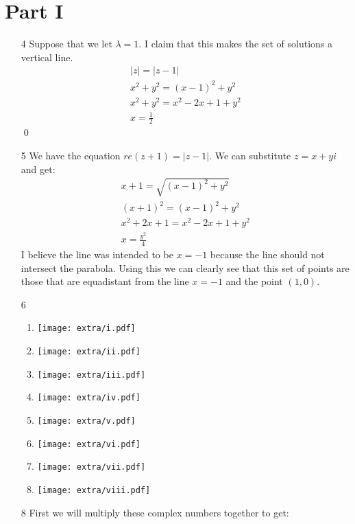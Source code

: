 \documentclass{article}
\begin{document}
  \section{Part I}
  \begin{enumerate}
    \item[4]
      Suppose that we let $\lambda=1$. I claim that this makes the set of solutions a vertical line.
      \begin{align}
        |z|=|z-1|\\
        x^2+y^2=(x-1)^2+y^2\\
        x^2+y^2=x^2-2x+1+y^2\\
        x=\frac{1}{2}
      \end{align}\qed
    \item[5]
      We have the equation $re(z+1)=|z-1|$. We can substitute $z=x+yi$ and get:
      \begin{align}
        x+1=\sqrt{(x-1)^2+y^2}\\
        (x+1)^2=(x-1)^2+y^2\\
        x^2+2x+1=x^2-2x+1+y^2\\
        x=\frac{y^2}{4}
      \end{align}
      I believe the line was intended to be $x=-1$ because the line should not intersect the parabola. Using this we can clearly see that this set of points are those that are equadistant from the line $x=-1$ and the point $(1,0)$.
    \item[6]
      \begin{enumerate}[label=\roman*]
        \item
          \texttt{[image: extra/i.pdf]}
        \item
          \texttt{[image: extra/ii.pdf]}
        \item
          \texttt{[image: extra/iii.pdf]}
        \item
          \texttt{[image: extra/iv.pdf]}
        \item
          \texttt{[image: extra/v.pdf]}
        \item
          \texttt{[image: extra/vi.pdf]}
        \item
          \texttt{[image: extra/vii.pdf]}
        \item
          \texttt{[image: extra/viii.pdf]}
      \end{enumerate}
    \item[8]
      First we will multiply these complex numbers together to get:

\end{enumerate}
\end{document}
